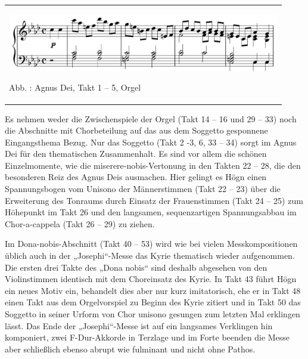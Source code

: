 \begin{center}
\tablefirsthead{}
\tablehead{}
\tabletail{}
\tablelasttail{}
\begin{supertabular}{m{12.107cm}}

\includegraphics[width=11.924cm,height=2.489cm]{pictures/zulassungsarbeit-img123.png}

Abb. : Agnus Dei, Takt 1 – 5, Orgel\\
\end{supertabular}
\end{center}
Es nehmen weder die Zwischenspiele der Orgel (Takt 14 – 16 und 29 – 33)
noch die Abschnitte mit Chorbeteilung auf das aus dem Soggetto
gesponnene Eingangsthema Bezug. Nur das Soggetto (Takt 2 -3, 6, 33 –
34) sorgt im Agnus Dei für den thematischen Zusammenhalt. Es sind vor
allem die schönen Einzelmomente, wie die miserere-nobis-Vertonung in
den Takten 22 – 28, die den besonderen Reiz des Agnus Deis ausmachen.
Hier gelingt es Högn einen Spannungsbogen vom Unisono der Männerstimmen
(Takt 22 – 23) über die Erweiterung des Tonraums durch Einsatz der
Frauenstimmen (Takt 24 – 25) zum Höhepunkt im Takt 26 und den
langsamen, sequenzartigen Spannungsabbau im Chor-a-cappela (Takt 26 –
29) zu ziehen.

Im Dona-nobis-Abschnitt (Takt 40 – 53) wird wie bei vielen
Messkompositionen üblich auch in der „Josephi“-Messe das Kyrie
thematisch wieder aufgenommen. Die ersten drei Takte des „Dona nobis“
sind deshalb abgesehen von den Violinstimmen identisch mit dem
Choreinsatz des Kyrie. In Takt 43 führt Högn ein neues Motiv ein,
behandelt dies aber nur kurz imitatorisch, ehe er in Takt 48 einen Takt
aus dem Orgelvorspiel zu Beginn des Kyrie zitiert und in Takt 50 das
Soggetto in seiner Urform von Chor unisono gesungen zum letzten Mal
erklingen lässt. Das Ende der „Josephi“-Messe ist auf ein langsames
Verklingen hin komponiert, zwei F-Dur-Akkorde in Terzlage und im Forte
beenden die Messe aber schließlich ebenso abrupt wie fulminant und
nicht ohne Pathos.